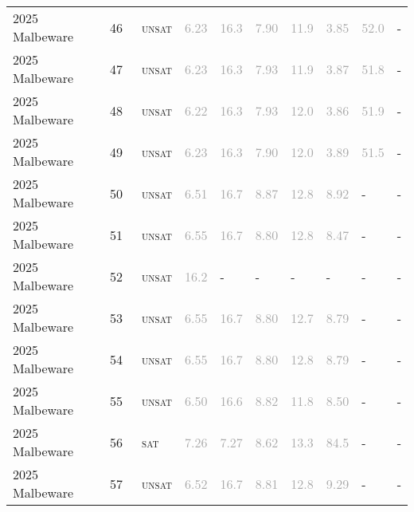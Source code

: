 \begin{center}
{\begin{longtable}{@{}llllllllll@{}}
2025 Malbeware & 46 & ~\textsc{unsat} & \textcolor{darkgray}{6.23} & \textcolor{darkgray}{16.3} & \textcolor{darkgray}{7.90} & \textcolor{darkgray}{11.9} & \textcolor{darkgray}{3.85} & \textcolor{darkgray}{52.0} & - \\
2025 Malbeware & 47 & ~\textsc{unsat} & \textcolor{darkgray}{6.23} & \textcolor{darkgray}{16.3} & \textcolor{darkgray}{7.93} & \textcolor{darkgray}{11.9} & \textcolor{darkgray}{3.87} & \textcolor{darkgray}{51.8} & - \\
2025 Malbeware & 48 & ~\textsc{unsat} & \textcolor{darkgray}{6.22} & \textcolor{darkgray}{16.3} & \textcolor{darkgray}{7.93} & \textcolor{darkgray}{12.0} & \textcolor{darkgray}{3.86} & \textcolor{darkgray}{51.9} & - \\
2025 Malbeware & 49 & ~\textsc{unsat} & \textcolor{darkgray}{6.23} & \textcolor{darkgray}{16.3} & \textcolor{darkgray}{7.90} & \textcolor{darkgray}{12.0} & \textcolor{darkgray}{3.89} & \textcolor{darkgray}{51.5} & - \\
2025 Malbeware & 50 & ~\textsc{unsat} & \textcolor{darkgray}{6.51} & \textcolor{darkgray}{16.7} & \textcolor{darkgray}{8.87} & \textcolor{darkgray}{12.8} & \textcolor{darkgray}{8.92} & - & - \\
2025 Malbeware & 51 & ~\textsc{unsat} & \textcolor{darkgray}{6.55} & \textcolor{darkgray}{16.7} & \textcolor{darkgray}{8.80} & \textcolor{darkgray}{12.8} & \textcolor{darkgray}{8.47} & - & - \\
2025 Malbeware & 52 & ~\textsc{unsat} & \textcolor{darkgray}{16.2} & - & - & - & - & - & - \\
2025 Malbeware & 53 & ~\textsc{unsat} & \textcolor{darkgray}{6.55} & \textcolor{darkgray}{16.7} & \textcolor{darkgray}{8.80} & \textcolor{darkgray}{12.7} & \textcolor{darkgray}{8.79} & - & - \\
2025 Malbeware & 54 & ~\textsc{unsat} & \textcolor{darkgray}{6.55} & \textcolor{darkgray}{16.7} & \textcolor{darkgray}{8.80} & \textcolor{darkgray}{12.8} & \textcolor{darkgray}{8.79} & - & - \\
2025 Malbeware & 55 & ~\textsc{unsat} & \textcolor{darkgray}{6.50} & \textcolor{darkgray}{16.6} & \textcolor{darkgray}{8.82} & \textcolor{darkgray}{11.8} & \textcolor{darkgray}{8.50} & - & - \\
2025 Malbeware & 56 & ~\textsc{sat} & \textcolor{darkgray}{7.26} & \textcolor{darkgray}{7.27} & \textcolor{darkgray}{8.62} & \textcolor{darkgray}{13.3} & \textcolor{darkgray}{84.5} & - & - \\
2025 Malbeware & 57 & ~\textsc{unsat} & \textcolor{darkgray}{6.52} & \textcolor{darkgray}{16.7} & \textcolor{darkgray}{8.81} & \textcolor{darkgray}{12.8} & \textcolor{darkgray}{9.29} & - & - \\

\end{longtable}}
\end{center}
